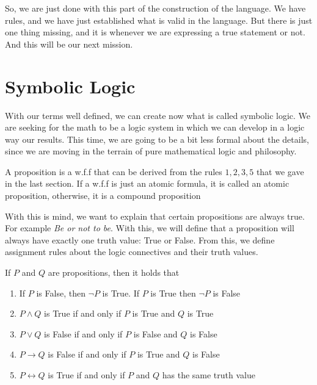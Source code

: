 \documentclass{tufte-handout}
\begin{document}
So, we are just done with this part of the construction of the language. We have rules, and we have just established what is valid in the language. But there is just one thing missing, and it is whenever we are expressing a true statement or not. And this will be our next mission.

\section{Symbolic Logic}
With our terms well defined, we can create now what is called symbolic logic. We are seeking for the math to be a logic system in which we can develop in a logic way our results. This time, we are going to be a bit less formal about the details, since we are moving in the terrain of pure mathematical logic and philosophy. 

\begin{definition}[Proposition]
	A proposition is a w.f.f that can be derived from the rules $1, 2, 3, 5$ that we gave in the last section. If a w.f.f is just an atomic formula, it is called an atomic proposition, otherwise, it is a compound proposition
\end{definition}

With this is mind, we want to explain that certain propositions are always true. For example \textit{Be or not to be}. With this, we will define that a proposition will always have exactly one truth value: True or False. From this, we define assignment rules about the logic connectives and their truth values.

\begin{definition}
	If $P$ and $Q$ are propositions, then it holds that
	\begin{enumerate}
		\item If $P$ is False, then $\neg P$ is True. If $P$ is True then $\neg P$ is False
		\item $P \wedge Q$ is True if and only if $P$ is True and $Q$ is True
		\item $P \vee Q$ is False if and only if $P$ is False and $Q$ is False
		\item $P \rightarrow Q$ is False if and only if $P$ is True and $Q$ is False
		\item $P \leftrightarrow Q$ is True if and only if $P$ and $Q$ has the same truth value
	\end{enumerate}
\end{definition}
\end{document}
